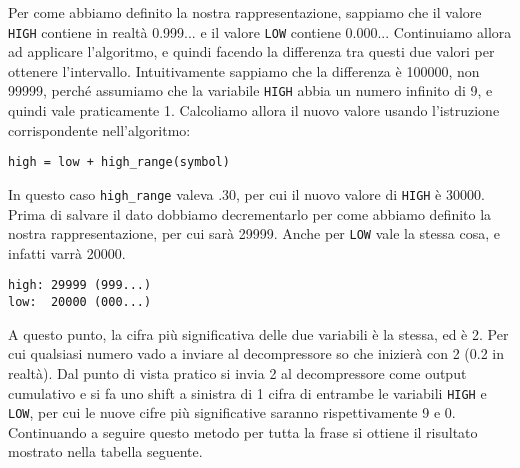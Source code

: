 Per come abbiamo definito la nostra rappresentazione, sappiamo che il valore \texttt{HIGH} contiene in realtà 0.999... e il valore \texttt{LOW} contiene 0.000... Continuiamo allora ad applicare l'algoritmo, e quindi facendo la differenza tra questi due valori per ottenere l'intervallo. Intuitivamente sappiamo che la differenza è 100000, non 99999, perché assumiamo che la variabile \texttt{HIGH} abbia un numero infinito di 9, e quindi vale praticamente 1. Calcoliamo allora il nuovo valore usando l'istruzione corrispondente nell'algoritmo:

\begin{lstlisting}
high = low + high_range(symbol)
\end{lstlisting}

In questo caso \texttt{high\_range} valeva .30, per cui il nuovo valore di \texttt{HIGH} è 30000. Prima di salvare il dato dobbiamo decrementarlo per come abbiamo definito la nostra rappresentazione, per cui sarà 29999. Anche per \texttt{LOW} vale la stessa cosa, e infatti varrà 20000. 

\begin{lstlisting}
high: 29999 (999...)
low:  20000 (000...)
\end{lstlisting}

A questo punto, la cifra più significativa delle due variabili è la stessa, ed è 2. Per cui qualsiasi numero vado a inviare al decompressore so che inizierà con 2 (0.2 in realtà). Dal punto di vista pratico si invia 2 al decompressore come output cumulativo e si fa uno shift a sinistra di 1 cifra di entrambe le variabili \texttt{HIGH} e \texttt{LOW}, per cui le nuove cifre più significative saranno rispettivamente 9 e 0. Continuando a seguire questo metodo per tutta la frase si ottiene il risultato mostrato nella tabella seguente.

